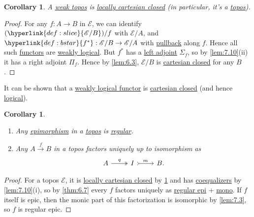 \documentclass{article}
\newtheorem{ncor}[nthm]{Corollary}
\begin{document}
\begin{ncor}\label{cor:7.13}
  A \hyperlink{def:wtopos}{weak topos} is \hyperlink{def:lcc}{locally cartesian closed} (in particular, it's a \hyperlink{def:topos}{topos}).
\end{ncor}
\begin{proof}
  For any $f: A \to B$ in $\mathscr{E}$, we can identify $(\hyperlink{def:slice}{\mathscr{E}/B})/f$ with $\mathscr{E}/A$, and $\hyperlink{def:bstar}{f^*}: \mathscr{E}/B \to \mathscr{E}/A$ with \hyperlink{def:pullback}{pullback} along $f$.
  Hence all such \hyperlink{def:funct}{functors} are \hyperlink{def:wtopos}{weakly logical}.
  But $f^*$ has a \hyperlink{def:adj}{left adjoint} $\Sigma_f$, so by \cref{lem:7.10}(ii) it has a right adjoint $\Pi_f$.
  Hence by \cref{lem:6.3}, $\mathscr{E}/B$ is \hyperlink{def:cc}{cartesian closed} for any $B$.
\end{proof}
\begin{remark}
  It can be shown that a \hyperlink{def:wtopos}{weakly logical functor} is \hyperlink{def:ccfunct}{cartesian closed} (and hence \hyperlink{def:lFunct}{logical}).
\end{remark}
\begin{ncor}\leavevmode\label{cor:7.14}
  \begin{enumerate}[label=(\roman*)]
    \item Any \hyperlink{def:epic}{epimorphism} in a \hyperlink{def:topos}{topos} is \hyperlink{def:regular}{regular}.
    \item Any $A \xrightarrow{f} B$ in a topos factors uniquely up to isomorphism as
      \begin{equation*}
        \begin{tikzcd}
        A \rar[two heads]{q} & I \rar[tail]{m} & B.
        \end{tikzcd}
      \end{equation*}
  \end{enumerate}
\end{ncor}
\begin{proof}
  For a topos $\mathscr{E}$, it is \hyperlink{def:lcc}{locally cartesian closed} by \cref{cor:7.13} and has \hyperlink{def:equalizer}{coequalizers} by \cref{lem:7.10}(i), so by \cref{thm:6.7} every $f$ factors uniquely as \hyperlink{def:epic}{regular epi} + \hyperlink{def:monic}{mono}.
  If $f$ itself is epic, then the monic part of this factorization is isomorphic by \cref{lem:7.3}, so $f$ is regular epic.
\end{proof}
\clearpage
\end{document}
